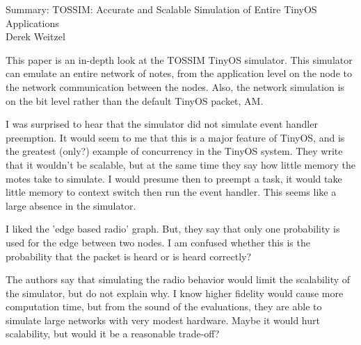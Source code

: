 \documentclass[12pt]{article}
\begin{document}
\begin{center}
{\huge Summary: TOSSIM: Accurate and Scalable Simulation of Entire TinyOS Applications} \\
Derek Weitzel
\end{center}

This paper is an in-depth look at the TOSSIM TinyOS simulator.  This simulator can emulate an entire network of notes, from the application level on the node to the network communication between the nodes.  Also, the network simulation is on the bit level rather than the default TinyOS packet, AM.  

I was surprised to hear that the simulator did not simulate event handler preemption.  It would seem to me that this is a major feature of TinyOS, and is the greatest (only?) example of concurrency in the TinyOS system.  They write that it wouldn't be scalable, but at the same time they say how little memory the motes take to simulate.  I would presume then to preempt a task, it would take little memory to context switch then run the event handler.  This seems like a large absence in the simulator.

I liked the 'edge based radio' graph.  But, they say that only one probability is used for the edge between two nodes.  I am confused whether this is the probability that the packet is heard or is heard correctly?

The authors say that simulating the radio behavior would limit the scalability of the simulator, but do not explain why.  I know higher fidelity would cause more computation time, but from the sound of the evaluations, they are able to simulate large networks with very modest hardware.  Maybe it would hurt scalability, but would it be a reasonable trade-off?
\end{document}
